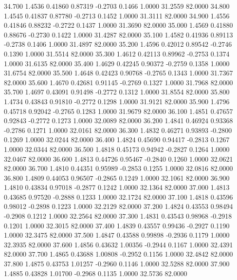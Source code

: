   34.700   1.4536   0.41860   0.87319  -0.2703   0.1466   1.0000  31.2559  82.0000
  34.800   1.4545   0.41837   0.87780  -0.2713   0.1452   1.0000  31.3111  82.0000
  34.900   1.4556   0.41846   0.88232  -0.2722   0.1437   1.0000  31.3690  82.0000
  35.000   1.4569   0.41880   0.88676  -0.2730   0.1422   1.0000  31.4287  82.0000
  35.100   1.4582   0.41936   0.89113  -0.2738   0.1406   1.0000  31.4897  82.0000
  35.200   1.4596   0.42012   0.89542  -0.2746   0.1390   1.0000  31.5514  82.0000
  35.300   1.4612   0.42113   0.89962  -0.2753   0.1374   1.0000  31.6135  82.0000
  35.400   1.4629   0.42245   0.90372  -0.2759   0.1358   1.0000  31.6754  82.0000
  35.500   1.4648   0.42423   0.90768  -0.2765   0.1343   1.0000  31.7367  82.0000
  35.600   1.4670   0.42681   0.91145  -0.2769   0.1327   1.0000  31.7968  82.0000
  35.700   1.4697   0.43091   0.91498  -0.2772   0.1312   1.0000  31.8554  82.0000
  35.800   1.4734   0.43843   0.91810  -0.2772   0.1298   1.0000  31.9121  82.0000
  35.900   1.4796   0.45718   0.92042  -0.2765   0.1283   1.0000  31.9679  82.0000
  36.100   1.4851   0.47657   0.92843  -0.2772   0.1273   1.0000  32.0089  82.0000
  36.200   1.4841   0.46924   0.93368  -0.2786   0.1271   1.0000  32.0161  82.0000
  36.300   1.4832   0.46271   0.93893  -0.2800   0.1269   1.0000  32.0244  82.0000
  36.400   1.4824   0.45690   0.94417  -0.2813   0.1267   1.0000  32.0344  82.0000
  36.500   1.4818   0.45173   0.94942  -0.2827   0.1264   1.0000  32.0467  82.0000
  36.600   1.4813   0.44726   0.95467  -0.2840   0.1260   1.0000  32.0621  82.0000
  36.700   1.4810   0.44351   0.95989  -0.2853   0.1255   1.0000  32.0816  82.0000
  36.800   1.4809   0.44053   0.96507  -0.2865   0.1249   1.0000  32.1061  82.0000
  36.900   1.4810   0.43834   0.97018  -0.2877   0.1242   1.0000  32.1364  82.0000
  37.000   1.4813   0.43685   0.97520  -0.2888   0.1233   1.0000  32.1724  82.0000
  37.100   1.4818   0.43596   0.98012  -0.2898   0.1223   1.0000  32.2129  82.0000
  37.200   1.4824   0.43553   0.98494  -0.2908   0.1212   1.0000  32.2564  82.0000
  37.300   1.4831   0.43543   0.98968  -0.2918   0.1201   1.0000  32.3015  82.0000
  37.400   1.4839   0.43557   0.99436  -0.2927   0.1190   1.0000  32.3475  82.0000
  37.500   1.4847   0.43588   0.99898  -0.2936   0.1179   1.0000  32.3935  82.0000
  37.600   1.4856   0.43632   1.00356  -0.2944   0.1167   1.0000  32.4391  82.0000
  37.700   1.4865   0.43688   1.00808  -0.2952   0.1156   1.0000  32.4842  82.0000
  37.800   1.4875   0.43753   1.01257  -0.2960   0.1146   1.0000  32.5288  82.0000
  37.900   1.4885   0.43828   1.01700  -0.2968   0.1135   1.0000  32.5736  82.0000
